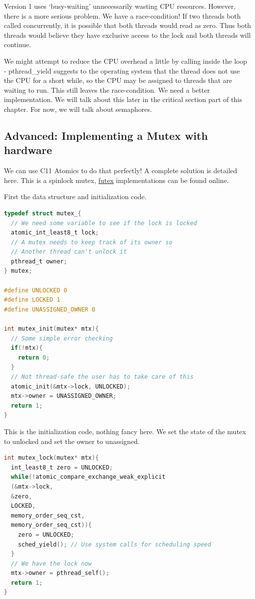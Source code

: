 Version 1 uses `busy-waiting' unnecessarily wasting CPU resources.
However, there is a more serious problem.
We have a race-condition!
If two threads both called  concurrently, it is possible that both threads would read  as zero.
Thus both threads would believe they have exclusive access to the lock and both threads will continue.

We might attempt to reduce the CPU overhead a little by calling  inside the loop - pthread\_yield suggests to the operating system that the thread does not use the CPU for a short while, so the CPU may be assigned to threads that are waiting to run.
This still leaves the race-condition.
We need a better implementation.
We will talk about this later in the critical section part of this chapter.
For now, we will talk about semaphores.

\subsection{Advanced: Implementing a Mutex with hardware}

We can use C11 Atomics to do that perfectly!
A complete solution is detailed here.
This is a spinlock mutex, \href{https://locklessinc.com/articles/mutex_cv_futex/}{futex} implementations can be found online.

First the data structure and initialization code.

\begin{lstlisting}[language=C]
typedef struct mutex_{
  // We need some variable to see if the lock is locked
  atomic_int_least8_t lock;
  // A mutex needs to keep track of its owner so
  // Another thread can't unlock it
  pthread_t owner;
} mutex;

#define UNLOCKED 0
#define LOCKED 1
#define UNASSIGNED_OWNER 0

int mutex_init(mutex* mtx){
  // Some simple error checking
  if(!mtx){
    return 0;
  }
  // Not thread-safe the user has to take care of this
  atomic_init(&mtx->lock, UNLOCKED);
  mtx->owner = UNASSIGNED_OWNER;
  return 1;
}
\end{lstlisting}

This is the initialization code, nothing fancy here.
We set the state of the mutex to unlocked and set the owner to unassigned.

\begin{lstlisting}[language=C]
int mutex_lock(mutex* mtx){
  int_least8_t zero = UNLOCKED;
  while(!atomic_compare_exchange_weak_explicit
  (&mtx->lock,
  &zero,
  LOCKED,
  memory_order_seq_cst,
  memory_order_seq_cst)){
    zero = UNLOCKED;
    sched_yield(); // Use system calls for scheduling speed
  }
  // We have the lock now
  mtx->owner = pthread_self();
  return 1;
}
\end{lstlisting}

